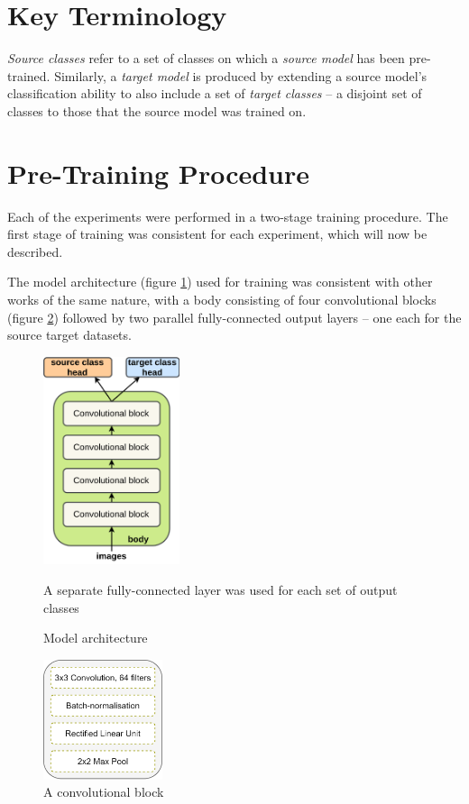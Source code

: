 \documentclass{report}
\begin{document}
	\section{Key Terminology}
	\textit{Source classes} refer to a set of classes on which a \textit{source model} has been pre-trained. Similarly, a \textit{target model} is produced by extending a source model's classification ability to also include a set of \textit{target classes} -- a disjoint set of classes to those that the source model was trained on. \par
	
	\section{Pre-Training Procedure} \label{pretrain}
	Each of the experiments were performed in a two-stage training procedure. The first stage of training was consistent for each experiment, which will now be described. \par
	The model architecture (figure \ref{fig:model:1}) used for training was consistent with other works of the same nature, with a body consisting of four convolutional blocks (figure \ref{fig:convblock:1}) followed by two parallel fully-connected output layers -- one each for the source target datasets. \par
	\begin{figure}[h]
		\centering
		\includegraphics[width=4cm]{modelarchitecture}
		\caption{Model architecture}
		\label{fig:model:1}
		A separate fully-connected layer was used for each set of output classes
	\end{figure}
	\begin{figure}[h]
		\centering
		\includegraphics[width=3.5cm]{convblock}
		\caption{A convolutional block}
		\label{fig:convblock:1}
	\end{figure}
\end{document}
